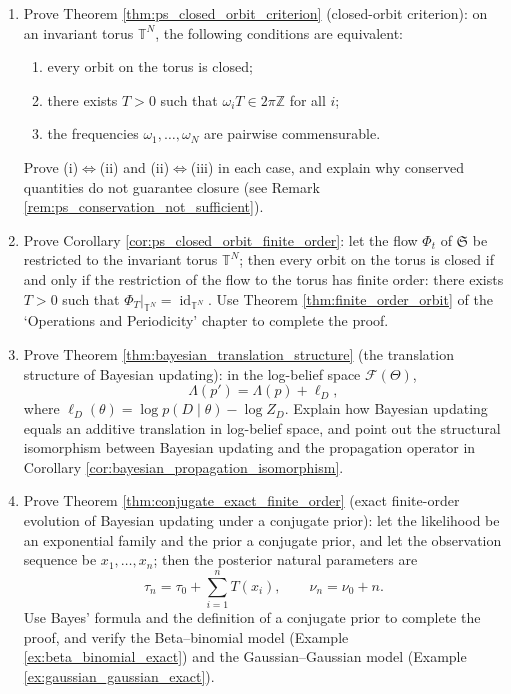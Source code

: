 \begin{enumerate}[leftmargin=3em, label=\textbf{Exercise \arabic*}]
    \item Prove Theorem \ref{thm:ps_closed_orbit_criterion} (closed-orbit criterion):
    on an invariant torus $\mathbb{T}^N$, the following conditions are equivalent:
    \begin{enumerate}[label=(\roman*)]
        \item every orbit on the torus is closed;
        \item there exists $T>0$ such that $\omega_iT\in2\pi\mathbb{Z}$ for all $i$;
        \item the frequencies $\omega_1,\dots,\omega_N$ are pairwise commensurable.
    \end{enumerate}
    Prove (i)$\Leftrightarrow$(ii) and (ii)$\Leftrightarrow$(iii) in each case,
    and explain why conserved quantities do not guarantee closure (see Remark \ref{rem:ps_conservation_not_sufficient}).

    \item Prove Corollary \ref{cor:ps_closed_orbit_finite_order}:
    let the flow $\Phi_t$ of $\mathfrak{S}$ be restricted to the invariant torus $\mathbb{T}^N$;
    then every orbit on the torus is closed if and only if the restriction of the flow to the torus has finite order:
    there exists $T>0$ such that $\Phi_T|_{\mathbb{T}^N}=\operatorname{id}_{\mathbb{T}^N}$.
    Use Theorem \ref{thm:finite_order_orbit} of the `Operations and Periodicity' chapter to complete the proof.

    \item Prove Theorem \ref{thm:bayesian_translation_structure} (the translation structure of Bayesian updating):
    in the log-belief space $\mathcal{F}(\Theta)$,
    \[
    \Lambda(p')=\Lambda(p)+\ell_D,
    \]
    where $\ell_D(\theta)=\log p(D\mid\theta)-\log Z_D$.
    Explain how Bayesian updating equals an additive translation in log-belief space,
    and point out the structural isomorphism between Bayesian updating and the propagation operator
    in Corollary \ref{cor:bayesian_propagation_isomorphism}.

    \item Prove Theorem \ref{thm:conjugate_exact_finite_order} (exact finite-order evolution of Bayesian updating under a conjugate prior):
    let the likelihood be an exponential family and the prior a conjugate prior, and let the observation sequence be $x_1,\dots,x_n$;
    then the posterior natural parameters are
    \[
    \tau_n=\tau_0+\sum_{i=1}^nT(x_i),\qquad
    \nu_n=\nu_0+n.
    \]
    Use Bayes' formula and the definition of a conjugate prior to complete the proof,
    and verify the Beta--binomial model (Example \ref{ex:beta_binomial_exact})
    and the Gaussian--Gaussian model (Example \ref{ex:gaussian_gaussian_exact}).


\end{enumerate}
